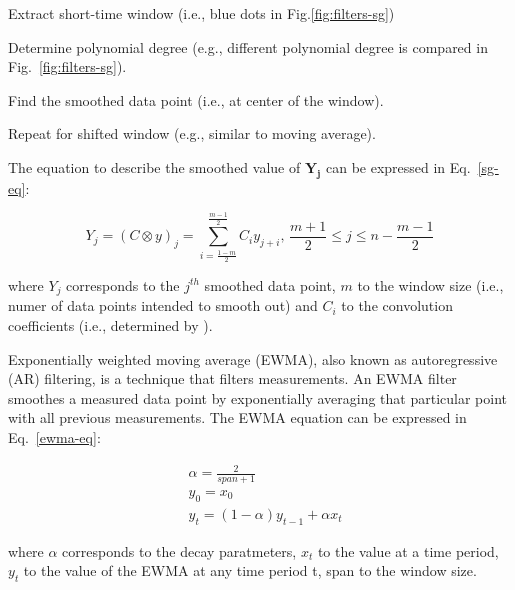 \noindent
\begin{myenumerate}
    \item Extract short-time window (i.e., blue dots in Fig.\ref{fig:filters-sg})
    \item Determine polynomial degree (e.g., different polynomial degree is compared in Fig.~\ref{fig:filters-sg}).
    \item Find the smoothed data point (i.e., at center of the window).
    \item Repeat for shifted window (e.g., similar to moving average).
\end{myenumerate}

The equation to describe the smoothed value of $\bm{Y_j}$ can be expressed in Eq.~\ref{sg-eq}:

\begin{equation}\label{sg-eq}
    Y_j=(C\otimes y)_j=\sum_{i=\frac{1-m}{2}}^{\frac{m-1}{2}}C_iy_{j+i},\,\frac{m+1}{2}\le j\le n-\frac{m-1}{2}
\end{equation}

\noindent
where $Y_j$ corresponds to the $j^{th}$ smoothed data point, $m$ to the window size (i.e., numer of data points intended to smooth out) and $C_i$ to the convolution coefficients (i.e., determined by \citet{savitzkySmoothingDifferentiationData1964}). 

Exponentially weighted moving average (EWMA), also known as autoregressive (AR) filtering, is a technique that filters measurements. An EWMA filter smoothes a measured data point by exponentially averaging that particular point with all previous measurements. The EWMA equation can be expressed in Eq.~\ref{ewma-eq}:

\begin{equation}\label{ewma-eq}
    \begin{aligned}
        &\alpha=\frac{2}{span+1} \\
        &y_0=x_0 \\
        &y_t=(1-\alpha)y_{t-1}+\alpha x_t
    \end{aligned}
\end{equation}

\noindent
where $\alpha$ corresponds to the decay paratmeters, $x_t$ to the value at a time period, $y_t$ to the value of the EWMA at any time period t, span to the window size.

